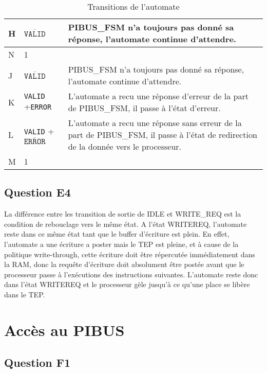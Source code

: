 \documentclass{article}
\begin{document}
\begin{table}[H]
\begin{tabular}{| l | l | p{12cm} |}
H
&
 $\overline{\texttt{VALID}}$
&
PIBUS\_FSM n'a toujours pas donné sa réponse, l'automate continue d'attendre.
\\
\hline

N
&
1
&
\\

\hline
\hline

J
&
 $\overline{\texttt{VALID}}$
&
PIBUS\_FSM n'a toujours pas donné sa réponse, l'automate continue d'attendre.
\\
\hline

K
&
\texttt{VALID}  +\texttt{ERROR}  
&
L'automate a recu une réponse d'erreur de la part de PIBUS\_FSM,
il passe à l'état d'erreur.
\\
\hline

L
&
\texttt{VALID}  + $\overline{\texttt{ERROR}}$
&
L'automate a recu une réponse sans erreur de la part de PIBUS\_FSM,
il passe à l'état de redirection de la donnée vers le processeur.
\\
\hline

M
&
1
&
\\
\hline

\end{tabular}
\caption{Transitions de l'automate}
\endgroup
\end{table}

\subsection{Question E4}

La différence entre les transition de sortie de IDLE et WRITE\_REQ est la
condition de rebouclage vers le même état. A l'état WRITEREQ, l'automate reste
dans ce même état tant que le buffer d'écriture est plein. En effet, l'automate
a une écriture a poster mais le TEP est pleine, et à cause de la politique
write-through, cette écriture doit être répercutée immédiatement dans la RAM,
donc la requête d'écriture doit absolument être postée avant que le processeur
passe à l'exécutions des instructions suivantes. L'automate reste donc dans
l'état WRITEREQ et le processeur gèle jusqu'à ce qu'une place se libère dans
le TEP.


\section{Accès au PIBUS}


\subsection{Question F1}
\end{document}
